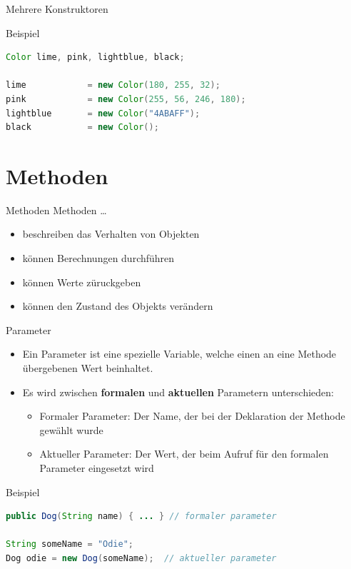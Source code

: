 \documentclass[18pt]{beamer}
\begin{document}
\begin{frame}[fragile]{Mehrere Konstruktoren}
    \begin{exampleblock}{Beispiel}
        \begin{lstlisting}[language=Java]
Color lime, pink, lightblue, black;

lime            = new Color(180, 255, 32);
pink            = new Color(255, 56, 246, 180);
lightblue       = new Color("4ABAFF");
black           = new Color();

        \end{lstlisting}

    \end{exampleblock}
\end{frame}


\section{Methoden}

\begin{frame}[fragile]{Methoden}
    Methoden \dots
    \begin{itemize}
        \item beschreiben das Verhalten von Objekten
        \item können Berechnungen durchführen
        \item können Werte züruckgeben
        \item können den Zustand des Objekts verändern
    \end{itemize}



\end{frame}

\begin{frame}[fragile]{Parameter}
    \begin{itemize}
        \item Ein Parameter ist eine spezielle Variable, welche einen an eine Methode übergebenen Wert beinhaltet.
        \pause
        \item Es wird zwischen \textbf{formalen} und \textbf{aktuellen} Parametern unterschieden:
        \begin{itemize}
            \item Formaler Parameter: Der Name, der bei der Deklaration der Methode gewählt wurde
            \item Aktueller Parameter: Der Wert, der beim Aufruf für den formalen Parameter eingesetzt wird
        \end{itemize}
    \end{itemize}

    \pause
    \begin{exampleblock}{Beispiel}
        \begin{lstlisting}[language=Java]
public Dog(String name) { ... } // formaler parameter

String someName = "Odie";
Dog odie = new Dog(someName);  // aktueller parameter
        \end{lstlisting}
    \end{exampleblock}

\end{frame}
\end{document}
